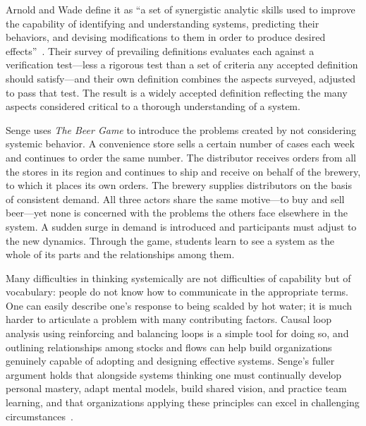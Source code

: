 \documentclass[11pt,a4paper]{article}
\begin{document}
Arnold and Wade define it as ``a set of synergistic analytic skills used to
improve the capability of identifying and understanding systems, predicting
their behaviors, and devising modifications to them in order to produce desired
effects''~\citep{arnold2015}. Their survey of prevailing definitions evaluates
each against a verification test---less a rigorous test than a set of criteria
any accepted definition should satisfy---and their own definition combines the
aspects surveyed, adjusted to pass that test. The result is a widely accepted
definition reflecting the many aspects considered critical to a thorough
understanding of a system.

Senge uses \emph{The Beer Game} to introduce the problems created by not
considering systemic behavior. A convenience store sells a certain number of
cases each week and continues to order the same number. The distributor receives
orders from all the stores in its region and continues to ship and receive on
behalf of the brewery, to which it places its own orders. The brewery supplies
distributors on the basis of consistent demand. All three actors share the same
motive---to buy and sell beer---yet none is concerned with the problems the
others face elsewhere in the system. A sudden surge in demand is introduced and
participants must adjust to the new dynamics. Through the game, students learn to
see a system as the whole of its parts and the relationships among them.

Many difficulties in thinking systemically are not difficulties of capability
but of vocabulary: people do not know how to communicate in the appropriate
terms. One can easily describe one's response to being scalded by hot water; it
is much harder to articulate a problem with many contributing factors. Causal
loop analysis using reinforcing and balancing loops is a simple tool for doing
so, and outlining relationships among stocks and flows can help build
organizations genuinely capable of adopting and designing effective systems.
Senge's fuller argument holds that alongside systems thinking one must
continually develop personal mastery, adapt mental models, build shared vision,
and practice team learning, and that organizations applying these principles can
excel in challenging circumstances~\citep{senge2018}.
\end{document}
